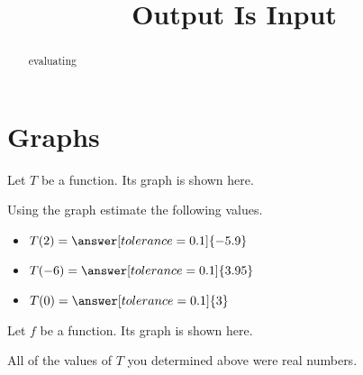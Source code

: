 \documentclass{ximera}
\title{Output Is Input}
\begin{document}
\begin{abstract}
evaluating
\end{abstract}
\maketitle











\section{Graphs}

Let $T$ be a function.  Its graph is shown here.




\begin{center}
\end{center}




\begin{question}


Using the graph estimate the following values.


\begin{itemize}

\item $T(2) = \answer[tolerance=0.1]{-5.9}$ \\

\item $T(-6) = \answer[tolerance=0.1]{3.95}$ \\

\item $T(0) = \answer[tolerance=0.1]{3}$ \\

\end{itemize}


\end{question}



Let $f$ be a function.  Its graph is shown here. 



\begin{center}
\end{center}







All of the values of $T$ you determined above were real numbers. 
\end{document}
